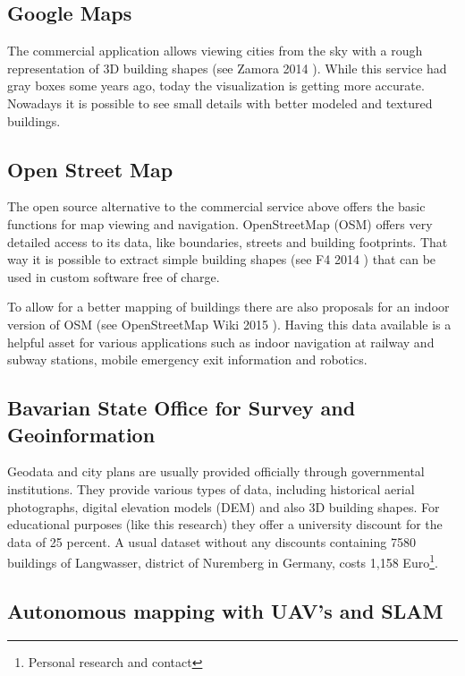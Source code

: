\subsection{Google Maps \textsuperscript{\textregistered} }

The commercial application allows viewing cities from the sky with a rough representation of 3D building shapes (see Zamora 2014 \parencite{google_maps}). While this service had gray boxes some years ago, today the visualization is getting more accurate. Nowadays it is possible to see small details with better modeled and textured buildings.

\subsection{Open Street Map \textsuperscript{\textregistered} }

The open source alternative to the commercial service above offers the basic functions for map viewing and navigation. OpenStreetMap (OSM) offers very detailed access to its data, like boundaries, streets and building footprints. That way it is possible to extract simple building shapes (see F4 2014 \parencite{f4map}) that can be used in custom software free of charge.

To allow for a better mapping of buildings there are also proposals for an indoor version of OSM (see OpenStreetMap Wiki 2015 \parencite{openstreetmap_wiki}). Having this data available is a helpful asset for various applications such as indoor navigation at railway and subway stations, mobile emergency exit information and robotics.

\subsection{Bavarian State Office for Survey and Geoinformation}

Geodata and city plans are usually provided officially through governmental institutions. They provide various types of data, including historical aerial photographs, digital elevation models (DEM) and also 3D building shapes. For educational purposes (like this research) they offer a university discount for the data of 25 percent. A usual dataset without any discounts containing 7580 buildings of Langwasser, district of Nuremberg in Germany, costs 1,158 Euro\footnote{Personal research and contact}.

\subsection{Autonomous mapping with UAV's and SLAM}

